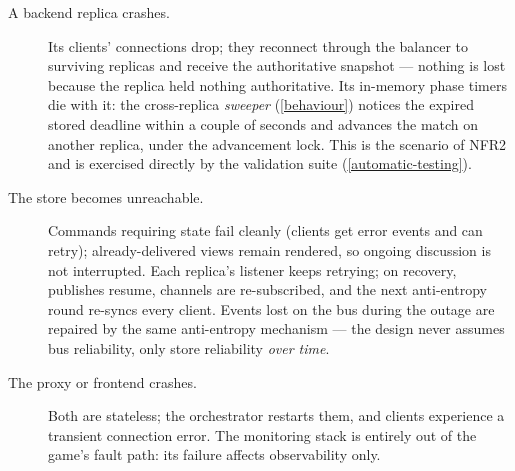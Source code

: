 \documentclass{scrartcl}
\begin{document}
\begin{description}
  \item[A backend replica crashes.] Its clients' connections drop; they
  reconnect through the balancer to surviving replicas and receive the
  authoritative snapshot --- nothing is lost because the replica held
  nothing authoritative. Its in-memory phase timers die with it: the
  cross-replica \emph{sweeper} (\cref{behaviour}) notices the expired
  stored deadline within a couple of seconds and advances the match on
  another replica, under the advancement lock. This is the scenario of
  NFR2 and is exercised directly by the validation suite
  (\cref{automatic-testing}).

  \item[The store becomes unreachable.] Commands requiring state fail
  cleanly (clients get error events and can retry); already-delivered
  views remain rendered, so ongoing discussion is not interrupted. Each
  replica's listener keeps retrying; on recovery, publishes resume,
  channels are re-subscribed, and the next anti-entropy round re-syncs
  every client. Events lost on the bus during the outage are repaired by
  the same anti-entropy mechanism --- the design never assumes bus
  reliability, only store reliability \emph{over time}.

  \item[The proxy or frontend crashes.] Both are stateless; the
  orchestrator restarts them, and clients experience a transient
  connection error. The monitoring stack is entirely out of the game's
  fault path: its failure affects observability only.
\end{description}
\end{document}
